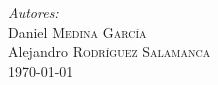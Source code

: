 \documentclass[12pt]{article}
\begin{document}
\begin{titlepage}


\emph{Autores:}\\
Daniel \textsc{Medina García}\\ %
Alejandro \textsc{Rodríguez Salamanca}\\[1.5cm] %


{\large \today}\\ %





\vfill %

\end{titlepage}

\tableofcontents

\newpage
\end{document}
